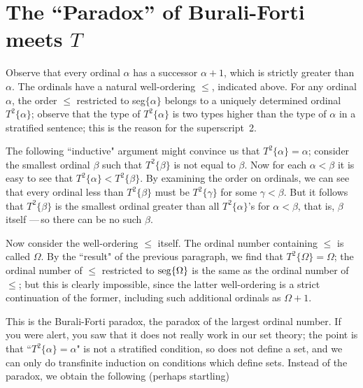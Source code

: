 \section[The ``Paradox'' of Burali-Forti meets
$T$]{The ``Paradox'' of Burali-Forti meets
$T$}

Observe that every ordinal $\alpha$ has a
successor $\alpha + 1$, which is strictly greater than
$\alpha$.  The ordinals have a natural well-ordering
$\leq$, indicated above.  For any ordinal $\alpha$, the order $\leq$ restricted
to seg$\{\alpha\}$ belongs to a uniquely determined ordinal
$T^2\{\alpha\}$; observe that
the type of $T^{2}\{\alpha\}$ is two types higher than
the type of $\alpha$ in a stratified sentence; this is
the reason for the superscript~2.

The following ``inductive" argument might convince us that
$T^{2}\{\alpha\} = \alpha$; consider the smallest ordinal $\beta$ such that $T^{2}\{\beta\}$ is not 
equal to $\beta$.  Now for each $\alpha < \beta$ it is easy to see that
$T^{2}\{\alpha\} <  T^{2}\{\beta\}$.  By examining the order on ordinals, we
can see that every ordinal less than $T^{2}\{\beta\}$ must be $T^{2}\{\gamma\}$
for some $\gamma < \beta$. 
But it follows that $T^{2}\{\beta\}$ is the smallest ordinal greater than all
$T^{2}\{\alpha\}$'s for $\alpha < \beta$, that is, $\beta$ itself ---\,so there
can be no such $\beta$.

Now consider the well-ordering $\leq$ itself.  The
ordinal number 
containing $\leq$ is called $\Omega$.  By the ``result" of the
previous paragraph, we find that $T^2\{\Omega\} = \Omega$; the ordinal
number of $\leq$ restricted to $\mathop{\mathrm{seg}}\{\Omega\}$ is the same as
the ordinal number of $\leq$; but this is clearly impossible, since the
latter well-ordering is a strict continuation of the former, including
such additional ordinals as $\Omega + 1$.

This is the Burali-Forti paradox, the paradox of
the largest ordinal number.  If you were alert, you saw
that it does not really work in our set theory; the point is that
``$T^2\{\alpha\} = \alpha$" is not a stratified
condition, so does not define a set, and we can only do
transfinite induction on conditions which define
sets.  Instead of the paradox, we obtain the following (perhaps startling)

